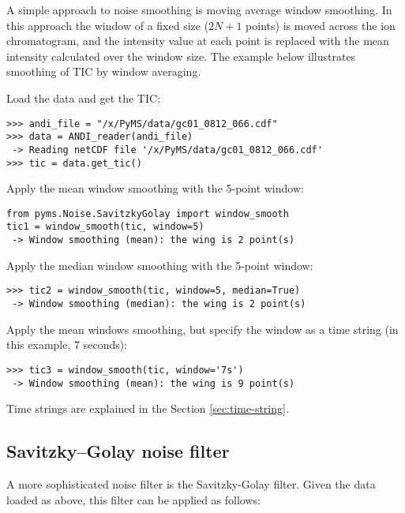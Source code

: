 
A simple approach to noise smoothing is moving average window smoothing.
In this approach the window of a fixed size ($2N+1$ points) is moved
across the ion chromatogram, and the intensity value at each point is
replaced with the mean intensity calculated over the window size.
The example below illustrates smoothing of TIC by window averaging.

Load the data and get the TIC:

\begin{verbatim}
>>> andi_file = "/x/PyMS/data/gc01_0812_066.cdf"
>>> data = ANDI_reader(andi_file)
 -> Reading netCDF file '/x/PyMS/data/gc01_0812_066.cdf'
>>> tic = data.get_tic()
\end{verbatim}

Apply the mean window smoothing with the 5-point window:

\begin{verbatim}
from pyms.Noise.SavitzkyGolay import window_smooth
tic1 = window_smooth(tic, window=5)
 -> Window smoothing (mean): the wing is 2 point(s)
\end{verbatim}

Apply the median window smoothing with the 5-point window:

\begin{verbatim}
>>> tic2 = window_smooth(tic, window=5, median=True)
 -> Window smoothing (median): the wing is 2 point(s)
\end{verbatim}

Apply the mean windows smoothing, but specify the window as
a time string (in this example, 7 seconds):

\begin{verbatim}
>>> tic3 = window_smooth(tic, window='7s')
 -> Window smoothing (mean): the wing is 9 point(s)
\end{verbatim}

Time strings are explained in the Section \ref{sec:time-string}.

\subsection{Savitzky--Golay noise filter}


A more sophisticated noise filter is the Savitzky-Golay filter.
Given the data loaded as above, this filter can be applied as
follows:

